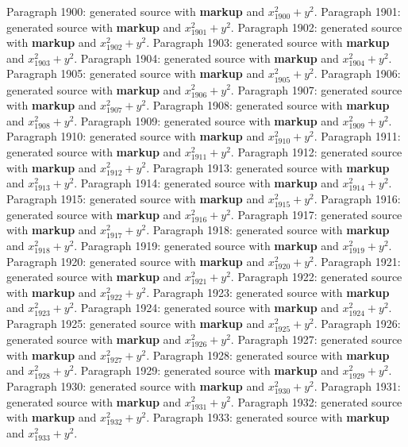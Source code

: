 \documentclass{article}
\begin{document}
Paragraph 1900: generated source with \textbf{markup} and $x_{1900}^2 + y^2$.
Paragraph 1901: generated source with \textbf{markup} and $x_{1901}^2 + y^2$.
Paragraph 1902: generated source with \textbf{markup} and $x_{1902}^2 + y^2$.
Paragraph 1903: generated source with \textbf{markup} and $x_{1903}^2 + y^2$.
Paragraph 1904: generated source with \textbf{markup} and $x_{1904}^2 + y^2$.
Paragraph 1905: generated source with \textbf{markup} and $x_{1905}^2 + y^2$.
Paragraph 1906: generated source with \textbf{markup} and $x_{1906}^2 + y^2$.
Paragraph 1907: generated source with \textbf{markup} and $x_{1907}^2 + y^2$.
Paragraph 1908: generated source with \textbf{markup} and $x_{1908}^2 + y^2$.
Paragraph 1909: generated source with \textbf{markup} and $x_{1909}^2 + y^2$.
Paragraph 1910: generated source with \textbf{markup} and $x_{1910}^2 + y^2$.
Paragraph 1911: generated source with \textbf{markup} and $x_{1911}^2 + y^2$.
Paragraph 1912: generated source with \textbf{markup} and $x_{1912}^2 + y^2$.
Paragraph 1913: generated source with \textbf{markup} and $x_{1913}^2 + y^2$.
Paragraph 1914: generated source with \textbf{markup} and $x_{1914}^2 + y^2$.
Paragraph 1915: generated source with \textbf{markup} and $x_{1915}^2 + y^2$.
Paragraph 1916: generated source with \textbf{markup} and $x_{1916}^2 + y^2$.
Paragraph 1917: generated source with \textbf{markup} and $x_{1917}^2 + y^2$.
Paragraph 1918: generated source with \textbf{markup} and $x_{1918}^2 + y^2$.
Paragraph 1919: generated source with \textbf{markup} and $x_{1919}^2 + y^2$.
Paragraph 1920: generated source with \textbf{markup} and $x_{1920}^2 + y^2$.
Paragraph 1921: generated source with \textbf{markup} and $x_{1921}^2 + y^2$.
Paragraph 1922: generated source with \textbf{markup} and $x_{1922}^2 + y^2$.
Paragraph 1923: generated source with \textbf{markup} and $x_{1923}^2 + y^2$.
Paragraph 1924: generated source with \textbf{markup} and $x_{1924}^2 + y^2$.
Paragraph 1925: generated source with \textbf{markup} and $x_{1925}^2 + y^2$.
Paragraph 1926: generated source with \textbf{markup} and $x_{1926}^2 + y^2$.
Paragraph 1927: generated source with \textbf{markup} and $x_{1927}^2 + y^2$.
Paragraph 1928: generated source with \textbf{markup} and $x_{1928}^2 + y^2$.
Paragraph 1929: generated source with \textbf{markup} and $x_{1929}^2 + y^2$.
Paragraph 1930: generated source with \textbf{markup} and $x_{1930}^2 + y^2$.
Paragraph 1931: generated source with \textbf{markup} and $x_{1931}^2 + y^2$.
Paragraph 1932: generated source with \textbf{markup} and $x_{1932}^2 + y^2$.
Paragraph 1933: generated source with \textbf{markup} and $x_{1933}^2 + y^2$.
\end{document}
